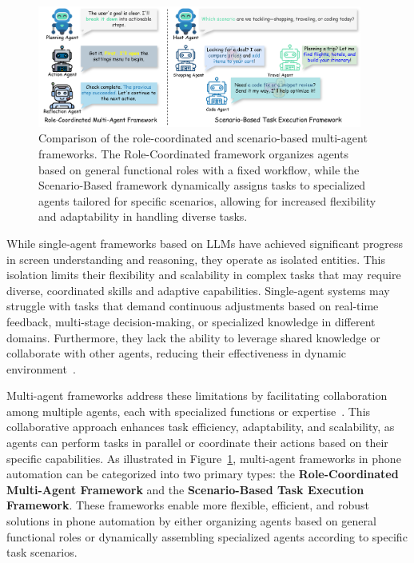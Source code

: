 \begin{figure}[ht] \centering \includegraphics[width=0.95\textwidth]{figures/multi_agent_frameworks.drawio.png} \caption{Comparison of the role-coordinated and scenario-based multi-agent frameworks. The Role-Coordinated framework organizes agents based on general functional roles with a fixed workflow, while the Scenario-Based framework dynamically assigns tasks to specialized agents tailored for specific scenarios, allowing for increased flexibility and adaptability in handling diverse tasks.} \label{fig:multi_agent_frameworks} \end{figure}


While single-agent frameworks based on LLMs have achieved significant progress in screen understanding and reasoning, they operate as isolated entities\cite{torreno2017cooperative,dorri2018multi,gong2023mindagent}. This isolation limits their flexibility and scalability in complex tasks that may require diverse, coordinated skills and adaptive capabilities. Single-agent systems may struggle with tasks that demand continuous adjustments based on real-time feedback, multi-stage decision-making, or specialized knowledge in different domains. Furthermore, they lack the ability to leverage shared knowledge or collaborate with other agents, reducing their effectiveness in dynamic environment~\cite{xi2023rise,wang2024mobileagentv2,tan2024cradle,song2024mmac}.

Multi-agent frameworks address these limitations by facilitating collaboration among multiple agents, each with specialized functions or expertise~\cite{chen2019control,talebirad2023multi,wu2023autogen,chen2023agentverse,li2023theory,liu2024dynamic,li2024survey,tran2025multi}. This collaborative approach enhances task efficiency, adaptability, and scalability, as agents can perform tasks in parallel or coordinate their actions based on their specific capabilities. As illustrated in Figure~\ref{fig:multi_agent_frameworks}, multi-agent frameworks in phone automation can be categorized into two primary types: the \textbf{Role-Coordinated Multi-Agent Framework} and the \textbf{Scenario-Based Task Execution Framework}. These frameworks enable more flexible, efficient, and robust solutions in phone automation by either organizing agents based on general functional roles or dynamically assembling specialized agents according to specific task scenarios.


